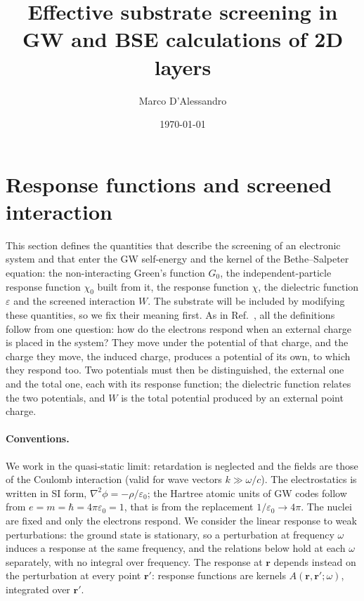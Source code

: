 \documentclass[10pt,a4paper]{paper}
\title{Effective substrate screening in GW and BSE calculations of 2D layers}
\author{Marco D'Alessandro}
\date{\today}
\begin{document}
\maketitle

\section{Response functions and screened interaction}
\label{sec:response}

This section defines the quantities that describe the screening of an electronic system and that enter the GW
self-energy and the kernel of the Bethe--Salpeter equation: the non-interacting Green's function $G_0$, the
independent-particle response function $\chi_0$ built from it, the response function $\chi$, the dielectric function
$\varepsilon$ and the screened interaction $W$. The substrate will
be included by modifying these quantities, so we fix their meaning first. As in Ref.~\cite{strinati1988application},
all the definitions follow from one question: how do the electrons respond when an external charge is placed in the
system? They move under the potential of that charge, and the charge they move, the induced charge, produces a
potential of its own, to which they respond too. Two potentials must then be distinguished, the external one and the
total one, each with its response function; the dielectric function relates the two potentials, and $W$ is the total
potential produced by an external point charge.

\paragraph{Conventions.} We work in the quasi-static limit: retardation is neglected and the fields are those of the
Coulomb interaction (valid for wave vectors $k \gg \omega/c$). The electrostatics is written in SI form,
$\nabla^2\phi = -\rho/\varepsilon_0$; the Hartree atomic units of GW codes follow from
$e = m = \hbar = 4\pi\varepsilon_0 = 1$, that is from the replacement $1/\varepsilon_0 \to 4\pi$. The nuclei are
fixed and only the electrons respond. We consider the linear response to weak perturbations: the ground state is
stationary, so a perturbation at frequency $\omega$ induces a response at the same frequency, and the relations below
hold at each $\omega$ separately, with no integral over frequency. The response at $\bm{r}$ depends instead on the
perturbation at every point $\bm{r}'$: response functions are kernels $A(\bm{r},\bm{r}';\omega)$, integrated over
$\bm{r}'$.
\end{document}
